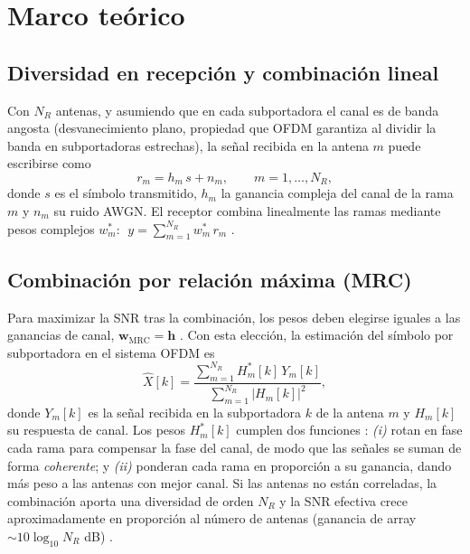 \documentclass[conference,onecolumn]{IEEEtran}
\begin{document}
\section{Marco te\'orico}

\subsection{Diversidad en recepci\'on y combinaci\'on lineal}

Con $N_R$ antenas, y asumiendo que en cada subportadora el canal es de banda angosta (desvanecimiento plano, propiedad que OFDM garantiza al dividir la banda en subportadoras estrechas), la se\~nal recibida en la antena $m$ puede escribirse como
\begin{equation}
r_m = h_m\, s + n_m, \qquad m = 1,\dots,N_R, \label{eq:rx}
\end{equation}
donde $s$ es el s\'imbolo transmitido, $h_m$ la ganancia compleja del canal de la rama $m$ y $n_m$ su ruido AWGN. El receptor combina linealmente las ramas mediante pesos complejos $w_m^{*}$: $\;y=\sum_{m=1}^{N_R} w_m^{*}\, r_m$ \cite{vazquezrodas_lte}.

\subsection{Combinaci\'on por relaci\'on m\'axima (MRC)}

Para maximizar la SNR tras la combinaci\'on, los pesos deben elegirse iguales a las ganancias de canal, $\mathbf{w}_{\mathrm{MRC}}=\mathbf{h}$ \cite{brennan2003linear,tse2005fundamentals}. Con esta elecci\'on, la estimaci\'on del s\'imbolo por subportadora en el sistema OFDM es
\begin{equation}
\hat{X}[k]=\frac{\sum_{m=1}^{N_R} H_m^{*}[k]\,Y_m[k]}{\sum_{m=1}^{N_R} |H_m[k]|^{2}}, \label{eq:mrc}
\end{equation}
donde $Y_m[k]$ es la se\~nal recibida en la subportadora $k$ de la antena $m$ y $H_m[k]$ su respuesta de canal. Los pesos $H_m^{*}[k]$ cumplen dos funciones \cite{vazquezrodas_lte}: \emph{(i)} rotan en fase cada rama para compensar la fase del canal, de modo que las se\~nales se suman de forma \emph{coherente}; y \emph{(ii)} ponderan cada rama en proporci\'on a su ganancia, dando m\'as peso a las antenas con mejor canal. Si las antenas no est\'an correladas, la combinaci\'on aporta una diversidad de orden $N_R$ y la SNR efectiva crece aproximadamente en proporci\'on al n\'umero de antenas (ganancia de array $\sim 10\log_{10} N_R$ dB) \cite{vazquezrodas_lte,goldsmith2005wireless}.
\end{document}
